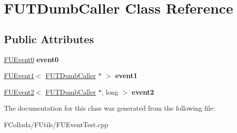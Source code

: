 \hypertarget{classFUTDumbCaller}{
\section{FUTDumbCaller Class Reference}
\label{classFUTDumbCaller}
}
\subsection*{Public Attributes}
\begin{DoxyCompactItemize}
\item 
\hypertarget{classFUTDumbCaller_a2b37db6f105db968a258eceb1f4e57ab}{
\hyperlink{classFUEvent0}{FUEvent0} {\bfseries event0}}
\label{classFUTDumbCaller_a2b37db6f105db968a258eceb1f4e57ab}

\item 
\hypertarget{classFUTDumbCaller_a9f55b46ec5faddfcd335688e0da216bb}{
\hyperlink{classFUEvent1}{FUEvent1}$<$ \hyperlink{classFUTDumbCaller}{FUTDumbCaller} $\ast$ $>$ {\bfseries event1}}
\label{classFUTDumbCaller_a9f55b46ec5faddfcd335688e0da216bb}

\item 
\hypertarget{classFUTDumbCaller_a1d9a6172969271fb610ac729fe5f8244}{
\hyperlink{classFUEvent2}{FUEvent2}$<$ \hyperlink{classFUTDumbCaller}{FUTDumbCaller} $\ast$, long $>$ {\bfseries event2}}
\label{classFUTDumbCaller_a1d9a6172969271fb610ac729fe5f8244}

\end{DoxyCompactItemize}


The documentation for this class was generated from the following file:\begin{DoxyCompactItemize}
\item 
FCollada/FUtils/FUEventTest.cpp\end{DoxyCompactItemize}
